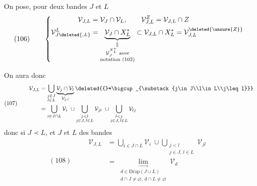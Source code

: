 On pose, pour deux bandes $J$ et $L$
\[
(106)\qquad\left\{\begin{aligned}
\mathcal V_{J,L}&=\mathcal V_J\cap\mathcal V_L,\qquad\mathcal V_{J,L}^Z=\mathcal V_{J,L}\cap Z\\
\mathcal V_{J\deleted{,L}}^L&=\underbrace{\mathcal V_J\cap X_L^*}_{\substack{\Vert\\\mathcal V_J^{X_L^*}\text{ avec}\\\text{notation }(102)}}\subset\mathcal V_{J,L}\cap X_L^*=\mathcal V_{J,L}^{\deleted{\unsure{Z}}}
\end{aligned}\right.
\]

On aura donc
\[
(107)\qquad\begin{aligned}
\mathcal V_{J,L}&=\bigcup_{\substack{j\in J\\l\in L}}\underbrace{\mathcal V_j\cap\mathcal V_l}_{\mathcal V_{j,l}}\deleted{{}=\bigcup_{\substack{j\in J\\l\in L\\j\leq l}}}\\
&=\bigcup_{i\in J\cap L}\mathcal V_i\ \cup\bigcup_{\substack{j<l\\j\in J,\,l\in L}}\mathcal V_{jl}\ \cup\bigcup_{\substack{l<j\\j\in J,\,l\in L}}\mathcal V_{lj}
\end{aligned}
\]
\deleted{\[=\underset{\unsure{d\in\mathrm{Drap}_{\geq2}(J\cup L)}}{\lim_{\longrightarrow}}\mathcal V_d\]}
donc si $J\prec L$, et $J$ et $L$ des bandes
\[
(108)\qquad\begin{aligned}
\mathcal V_{J,L}&=\bigcup_{i\in J\cap L}\mathcal V_i\ \cup\bigcup_{\substack{j<l\\j\in J,\,l\in L}}\mathcal V_{jl}\\
&=\underset{\substack{d\in\mathrm{Drap}(J\cup L)\\d\cap J\ne\varnothing,\,d\cap L\ne\varnothing}}{\lim_{\longrightarrow}}\mathcal V_d
\end{aligned}
\]

